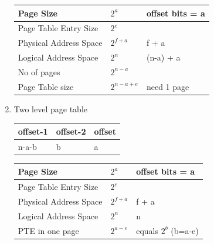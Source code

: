 \begin{enumerate}
  \begin{myTableStyle}
    \begin{tabular}{ |m{4cm}|m{2cm}|m{5cm}| } \hline
        Page Size               &   \(2^a\)         & offset bits = a        \\ \hline
        Page Table Entry Size   &   \(2^e\)         &                         \\ \hline
        Physical Address Space  &   \(2^{f+a}\)     & f + a                 \\ \hline
        Logical Address Space   &   \(2^n\)         & (n-a) + a                 \\ \hline
        No of pages             &   \(2^{n-a}\)     &                         \\ \hline
        Page Table size         &   \(2^{n-a+e}\)   & need 1 page             \\ \hline
    \end{tabular}
  \end{myTableStyle}
  \vspace{0.08in}

  \item Two level page table \\

    \begin{myTableStyle}
    \begin{tabular}{ |m{2.5cm}|m{2.5cm}|m{1cm}| } \hline
        offset-1 & offset-2  &  offset  \\ \hline
        n-a-b   &   b  &  a         \\ \hline
    \end{tabular}
  \end{myTableStyle}
  \vspace{0.08in}

  \begin{myTableStyle}
    \begin{tabular}{ |m{4cm}|m{2cm}|m{5cm}| } \hline
        Page Size               &   \(2^a\)         & offset bits = a         \\ \hline
        Page Table Entry Size   &   \(2^e\)         &                         \\ \hline
        Physical Address Space  &   \(2^{f+a}\)     & f + a                   \\ \hline
        Logical Address Space   &   \(2^n\)         & n                       \\ \hline
        PTE in one page         &   \(2^{a-e}\)     & equals \(2^b\) (b=a-e)  \\ \hline
    \end{tabular}
  \end{myTableStyle}
  \vspace{0.08in}


\end{enumerate}
